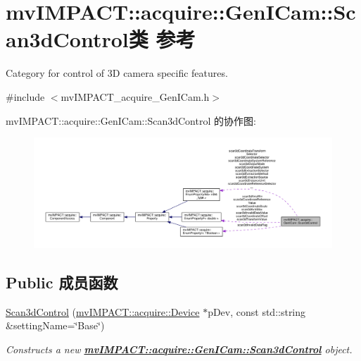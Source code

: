 \hypertarget{classmv_i_m_p_a_c_t_1_1acquire_1_1_gen_i_cam_1_1_scan3d_control}{\section{mv\+I\+M\+P\+A\+C\+T\+:\+:acquire\+:\+:Gen\+I\+Cam\+:\+:Scan3d\+Control类 参考}
\label{classmv_i_m_p_a_c_t_1_1acquire_1_1_gen_i_cam_1_1_scan3d_control}
}


Category for control of 3\+D camera specific features.  




{\ttfamily \#include $<$mv\+I\+M\+P\+A\+C\+T\+\_\+acquire\+\_\+\+Gen\+I\+Cam.\+h$>$}



mv\+I\+M\+P\+A\+C\+T\+:\+:acquire\+:\+:Gen\+I\+Cam\+:\+:Scan3d\+Control 的协作图\+:
\nopagebreak
\begin{figure}[H]
\begin{center}
\leavevmode
\includegraphics[width=350pt]{classmv_i_m_p_a_c_t_1_1acquire_1_1_gen_i_cam_1_1_scan3d_control__coll__graph}
\end{center}
\end{figure}
\subsection*{Public 成员函数}
\begin{DoxyCompactItemize}
\item 
\hyperlink{classmv_i_m_p_a_c_t_1_1acquire_1_1_gen_i_cam_1_1_scan3d_control_a9bb83fe01c85b71aa80fb359e74a0d46}{Scan3d\+Control} (\hyperlink{classmv_i_m_p_a_c_t_1_1acquire_1_1_device}{mv\+I\+M\+P\+A\+C\+T\+::acquire\+::\+Device} $\ast$p\+Dev, const std\+::string \&setting\+Name=\char`\"{}Base\char`\"{})
\begin{DoxyCompactList}\small\item\em Constructs a new {\bfseries \hyperlink{classmv_i_m_p_a_c_t_1_1acquire_1_1_gen_i_cam_1_1_scan3d_control}{mv\+I\+M\+P\+A\+C\+T\+::acquire\+::\+Gen\+I\+Cam\+::\+Scan3d\+Control}} object. \end{DoxyCompactList}\end{DoxyCompactItemize}
